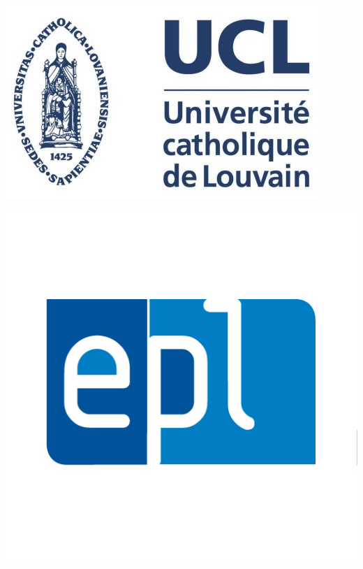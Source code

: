 \begin{titlepage}
\vspace*{1cm}
\centering
\begin{minipage}{0.2\linewidth}
	\includegraphics[scale=0.2]{images/logo_ucl.jpg}
\end{minipage} \hspace{-10pt}
\begin{minipage}{0.2\linewidth}
\centering
    \includegraphics[scale=0.2]{images/logo_epl.jpg}
\end{minipage}
\end{titlepage}
\restoregeometry
